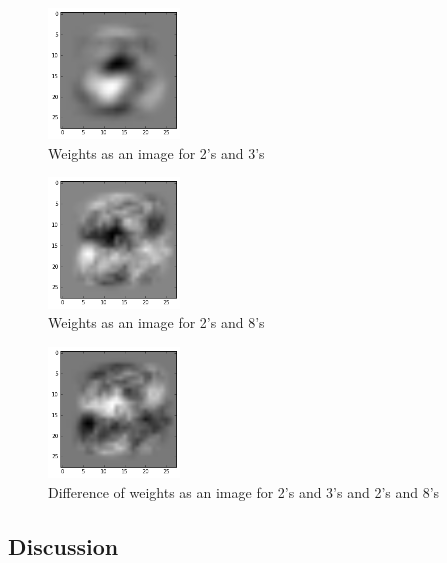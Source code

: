 \documentclass{article}
\begin{document}
\begin{figure}[h!]
  \centering
  \includegraphics[width=35mm, scale=0.4]{graphs/23WeightsImage.png}
  \caption{Weights as an image for 2's and 3's}
   \label{fig6}
\end{figure}

\begin{figure}[h!]
  \centering
  \includegraphics[width=35mm, scale=0.4]{graphs/28WeightsImage.png}
  \caption{Weights as an image for 2's and 8's}
    \label{fig7}
\end{figure}

\begin{figure}[h!]
  \centering
  \includegraphics[width=35mm, scale=0.4]{graphs/DifferenceWeightsImageNoReg23_28.png}
  \caption{Difference of weights as an image for 2's and 3's and 2's and 8's}
    \label{fig8}
\end{figure}


\subsection{Discussion}
\end{document}
